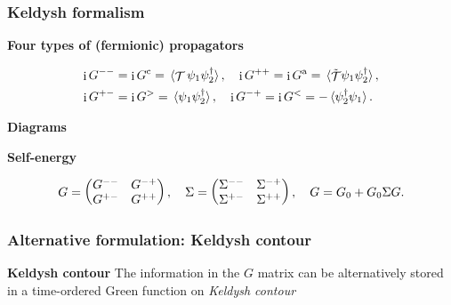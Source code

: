 \documentclass[t]{beamer}
\DeclareMathOperator{\ii}{i}
\DeclareMathOperator{\timeorder}{\mathcal{T}}
\begin{document}
\begin{frame}
\frametitle{Keldysh formalism}

\textbf{Four types of (fermionic) propagators}

\begin{equation}
    \begin{aligned}
        \ii G^{--} &= \ii G^{\text{c}} = \expval*{\timeorder \psi_1 \psi_2^\dagger}, \quad 
        \ii G^{++} = \ii G^{\text{a}} = \expval*{\tilde{\timeorder} \psi_1 \psi_2^\dagger}, \\
        \ii G^{+-} &= \ii G^{>} = \expval*{\psi_1 \psi_2^\dagger},   \quad 
        \ii G^{-+} = \ii G^{<} = - \expval*{\psi_2^\dagger \psi_1}.
    \end{aligned}
\end{equation}    

\vspace{0.5cm}

\textbf{Diagrams} 

\begin{center}
    
\end{center}

\textbf{Self-energy} 

\begin{equation}
    G = \pmqty{
        G^{--} & G^{-+} \\ 
        G^{+-} & G^{++}
    }   , \quad 
    \Sigma = \pmqty{
        \Sigma^{--} & \Sigma^{-+} \\ 
        \Sigma^{+-} & \Sigma^{++}
    } , \quad 
    G = G_0 + G_0 \Sigma G.
\end{equation}

\end{frame}

\begin{frame}
\frametitle{Alternative formulation: Keldysh contour}

\textbf{Keldysh contour} The information in the $G$ matrix can be alternatively stored 
in a time-ordered Green function on \emph{Keldysh contour}

\begin{center}
    
\end{center}


\end{frame}
\end{document}
